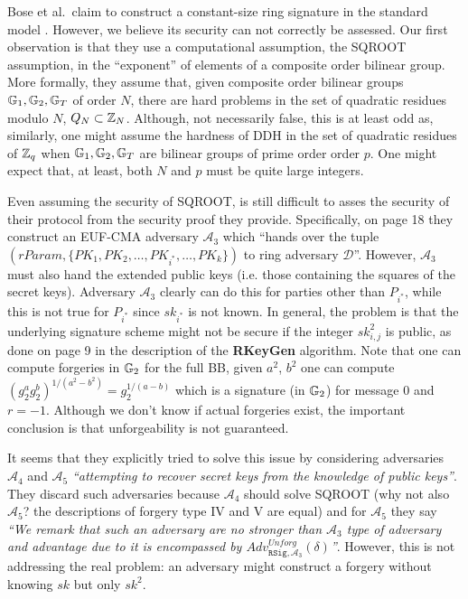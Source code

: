 
Bose et al.~claim to construct a constant-size ring signature in the standard model \cite{ACISP:BosDasRan15}. However, we believe its security can not correctly be assessed. Our first observation is that they use a computational assumption, the SQROOT assumption, in the ``exponent'' of elements of a composite order bilinear group. More formally, they assume that, given composite order bilinear groups $\mathbb{G}_1,\mathbb{G}_2,\mathbb{G}_T$ of order $N$, there are hard problems in the set of quadratic residues modulo $N$, $Q_N\subset \mathbb{Z}_N$. Although, not necessarily false, this is at least odd as, similarly, one might assume the hardness of DDH in the set of quadratic residues of $\mathbb{Z}_q$ when $\mathbb{G}_1,\mathbb{G}_2,\mathbb{G}_T$ are bilinear groups of prime order order $p$. One might expect that, at least, both $N$ and $p$ must be quite large integers.

Even assuming the security of SQROOT, is still difficult to asses the security of their protocol from the security proof they provide. Specifically, on page 18 they construct an EUF-CMA adversary $\mathcal{A}_3$ which ``hands over the tuple $(rParam, \{PK_1, PK_2, \ldots, PK_{i^*} , \ldots, PK_k\})$ to ring adversary $\mathcal{D}$''. However, $\mathcal{A}_3$ must also hand the extended public keys (i.e. those containing the squares of the secret keys). Adversary $\mathcal{A}_3$ clearly can do this for parties other than $P_{i^*}$, while this is not true for $P_{i^*}$ since $sk_{i^*}$ is not known.
In general, the problem is that the underlying signature scheme might not be secure if the integer $sk_{i,j}^2$ is public, as done on page 9 in the description of the {\bf RKeyGen} algorithm. Note that one can compute forgeries in $\mathbb{G}_2$ for the full BB, given $a^2$, $b^2$ one can compute $(g_2^{a} g_2^{b})^{1/(a^2-b^2)}=g_2^{1/(a-b)}$ which is a signature (in $\mathbb{G}_2$) for message $0$ and $r=-1$. Although we don't know if actual forgeries exist, the important conclusion is that unforgeability is not guaranteed.

It seems that they explicitly tried to solve this issue by considering adversaries $\mathcal{A}_4$ and $\mathcal{A}_5$ \emph{``attempting to recover secret keys from the knowledge of public keys''}. 
They discard such adversaries because $\mathcal{A}_4$ should solve  SQROOT (why not also $\mathcal{A}_5$? the descriptions of forgery type IV and V are equal) and for $\mathcal{A}_5$ they say \emph{``We remark that such an adversary are no stronger than $\mathcal{A}_3$ type of adversary and advantage due to it is encompassed by $Adv^{Unforg}_{\mathtt{RSig},\mathcal{A}_3} (\delta)$''}. However, this is not addressing the real problem: an adversary might construct a forgery without knowing $sk$ but only $sk^2$.

